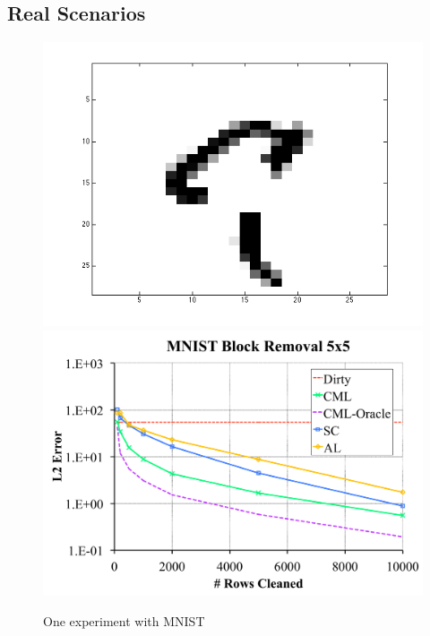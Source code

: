 \subsection{Real Scenarios}

\begin{figure}[t]
\centering
 \includegraphics[scale=0.25]{exp/5x5removal.png}
 \includegraphics[scale=0.15]{exp/exp7a.pdf}
 \caption{One experiment with MNIST}
\end{figure}

